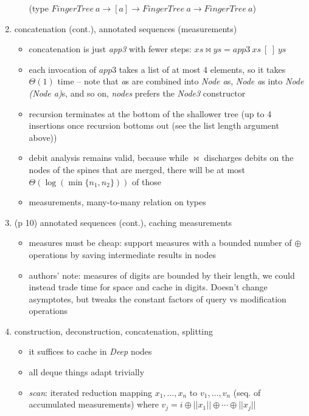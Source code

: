 \documentclass[a4paper]{article}
\begin{document}
\begin{enumerate}[nosep]
\begin{itemize}
				(type $\mathit{FingerTree~a \rightarrow [a]
				\rightarrow FingerTree~a \rightarrow FingerTree~a}$)
		\end{itemize}
	\item concatenation (cont.), annotated sequences (measurements)
		\begin{itemize}
			\item concatenation is just \textit{app3} with fewer steps:
				$\mathit{xs \bowtie ys = app3~xs~[~]~ys}$
			\item each invocation of $\mathit{app3}$ takes a list of at most 4
				elements, so it takes $\Theta(1)$ time -- note that \textit{a}s
				are combined into \textit{Node a}s, \textit{Node a}s into
				\textit{Node (Node a)}s, and so on, \textit{nodes} prefers the
				\textit{Node3} constructor
			\item recursion terminates at the bottom of the shallower tree (up
				to 4 insertions once recursion bottoms out (see the list length
				argument above))
			\item debit analysis remains valid, because while $\bowtie$
				discharges debits on the nodes of the spines that are merged,
				there will be at most $\Theta(\log(\min\{n_1, n_2\}))$ of those
			\item measurements, many-to-many relation on types
		\end{itemize}
	\item (p 10) annotated sequences (cont.), caching measurements
		\begin{itemize}
			\item measures must be cheap: support measures with a bounded
				number of $\oplus$ operations by saving intermediate results in
				nodes
			\item authors' note: measures of digits are bounded by their
				length, we could instead trade time for space and cache in
				digits. Doesn't change asymptotes, but tweaks the constant
				factors of query vs modification operations
		\end{itemize}
	\item construction, deconstruction, concatenation, splitting
		\begin{itemize}
			\item it suffices to cache in \textit{Deep} nodes
			\item all deque things adapt trivially
			\item \textit{scan}: iterated reduction mapping $x_1, \ldots, x_n$
				to $v_1, \ldots, v_n$ (seq. of accumulated measurements) where
				$v_j = i \oplus || x_1 || \oplus \cdots \oplus || x_j ||$

\end{itemize}
\end{enumerate}
\end{document}
